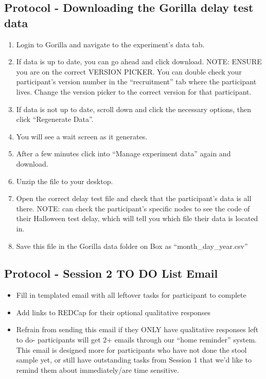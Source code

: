 \documentclass[]{book}
\begin{document}
\hypertarget{protocol---downloading-the-gorilla-delay-test-data-2}{%
\subsection{Protocol - Downloading the Gorilla delay test data}\label{protocol---downloading-the-gorilla-delay-test-data-2}}

\begin{enumerate}
\def\labelenumi{\arabic{enumi}.}
\item
  Login to Gorilla and navigate to the experiment's data tab.
\item
  If data is up to date, you can go ahead and click download. NOTE: ENSURE you are on the correct VERSION PICKER. You can double check your participant's version number in the ``recruitment'' tab where the participant lives. Change the version picker to the correct version for that participant.
\item
  If data is not up to date, scroll down and click the necessary options, then click ``Regenerate Data''.
\item
  You will see a wait screen as it generates.
\item
  After a few minutes click into ``Manage experiment data'' again and download.
\item
  Unzip the file to your desktop.
\item
  Open the correct delay test file and check that the participant's data is all there. NOTE: can check the participant's specific nodes to see the code of their Halloween test delay, which will tell you which file their data is located in.
\item
  Save this file in the Gorilla data folder on Box as ``month\_day\_year.csv''
\end{enumerate}

\hypertarget{protocol---session-2-to-do-list-email-2}{%
\subsection{Protocol - Session 2 TO DO List Email}\label{protocol---session-2-to-do-list-email-2}}

\begin{itemize}
\item
  Fill in templated email with all leftover tasks for participant to complete
\item
  Add links to REDCap for their optional qualitative responses
\item
  Refrain from sending this email if they ONLY have qualitative responses left to do- participants will get 2+ emails through our ``home reminder'' system. This email is designed more for participants who have not done the stool sample yet, or still have outstanding tasks from Session 1 that we'd like to remind them about immediately/are time sensitive.
\end{itemize}
\end{document}
